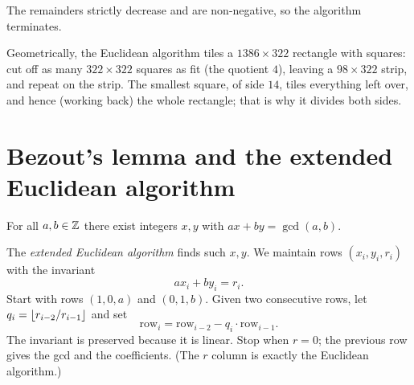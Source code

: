 The remainders strictly decrease and are non-negative, so the algorithm terminates.

Geometrically, the Euclidean algorithm tiles a $1386 \times 322$ rectangle with squares: cut
off as many $322 \times 322$ squares as fit (the quotient $4$), leaving a $98\times 322$ strip,
and repeat on the strip. The smallest square, of side $14$, tiles everything left over, and
hence (working back) the whole rectangle; that is why it divides both sides.
\begin{center}
\end{center}

\section{Bezout's lemma and the extended Euclidean algorithm}

\begin{theorem}
For all $a,b \in \mathbb{Z}$ there exist integers $x,y$ with $ax + by = \gcd(a,b)$.
\end{theorem}

The \emph{extended Euclidean algorithm} finds such $x,y$. We maintain rows $(x_i, y_i, r_i)$
with the invariant
\[ a x_i + b y_i = r_i. \]
Start with rows $(1, 0, a)$ and $(0, 1, b)$. Given two consecutive rows, let
$q_{i} = \left\lfloor r_{i-2}/r_{i-1} \right\rfloor$ and set
\[ \text{row}_i = \text{row}_{i-2} - q_i\cdot \text{row}_{i-1}. \]
The invariant is preserved because it is linear. Stop when $r = 0$; the previous row gives the
gcd and the coefficients. (The $r$ column is exactly the Euclidean algorithm.)

